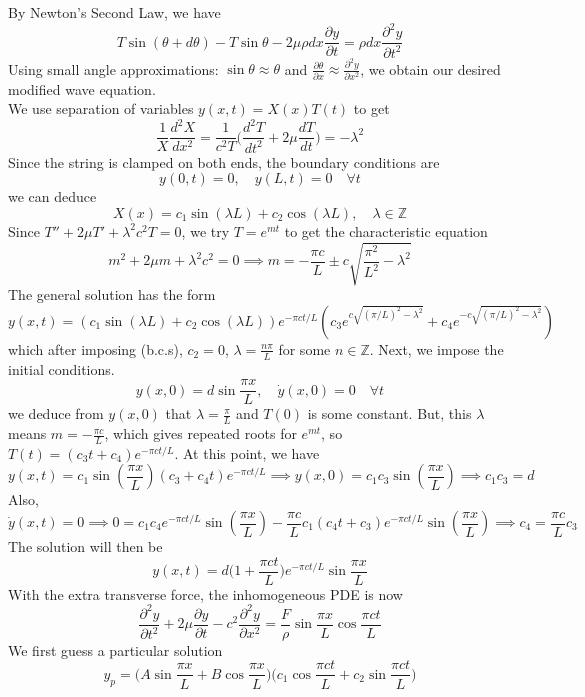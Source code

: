 \documentclass[a4paper]{article}
\begin{document}
\begin{ans}
By Newton's Second Law, we have
$$T\sin(\theta+d\theta)-T\sin\theta-2\mu\rho dx\frac{\partial y}{\partial t}=\rho dx\frac{\partial^2y}{\partial t^2}$$
Using small angle approximations: $\sin\theta\approx\theta$ and $\frac{\partial\theta}{\partial x}\approx\frac{\partial^2y}{\partial x^2}$, we obtain our desired modified wave equation.\\[5pt]
We use separation of variables $y(x,t)=X(x)T(t)$ to get $$\frac{1}{X}\frac{d^2X}{dx^2}=\frac{1}{c^2T}\bigg(\frac{d^2T}{dt^2}+2\mu\frac{dT}{dt}\bigg)=-\lambda^2$$
Since the string is clamped on both ends, the boundary conditions are 
\begin{equation}
    y(0,t)=0,\quad y(L,t)=0\quad \forall t\tag{b.c.s}
\end{equation}
we can deduce 
$$X(x)=c_1\sin(\lambda L)+c_2\cos(\lambda L),\quad\lambda\in\mathbb{Z}$$
Since $T''+2\mu T'+\lambda^2c^2T=0$, we try $T=e^{mt}$ to get the characteristic equation
$$m^2+2\mu m+\lambda^2c^2=0\implies m=-\frac{\pi c}{L}\pm c\sqrt{\frac{\pi^2}{L^2}-\lambda^2}$$
The general solution has the form
$$y(x,t)=(c_1\sin(\lambda L)+c_2\cos(\lambda L))e^{-\pi ct/L}(c_3e^{c\sqrt{(\pi/L)^2-\lambda^2}}+c_4e^{-c\sqrt{(\pi/L)^2-\lambda^2}})$$
which after imposing (b.c.s), $c_2=0$, $\lambda=\frac{n\pi}{L}$ for some $n\in\mathbb{Z}$. Next, we impose the initial conditions. 
\begin{equation}
    y(x,0)=d\sin\frac{\pi x}{L},\quad\dot{y}(x,0)=0\quad \forall t \tag{i.c.s}
\end{equation}
we deduce from $y(x,0)$ that $\lambda=\frac{\pi}{L}$ and $T(0)$ is some constant. But, this $\lambda$ means $m=-\frac{\pi c}{L}$, which gives repeated roots for $e^{mt}$, so $T(t)=(c_3t+c_4)e^{-\pi ct/L}$. At this point, we have 
$$y(x,t)=c_1\sin(\frac{\pi x}{L})(c_3+c_4t)e^{-\pi ct/L}\implies y(x,0)=c_1c_3\sin(\frac{\pi x}{L})\implies  c_1c_3=d$$
Also, 
$$\dot{y}(x,t)=0\implies 0=c_1c_4e^{-\pi ct/L}\sin(\frac{\pi x}{L})-\frac{\pi c}{L}c_1(c_4t+c_3)e^{-\pi ct/L}\sin(\frac{\pi x}{L})\implies c_4=\frac{\pi c}{L}c_3$$
The solution will then be
$$y(x,t)=d\bigg(1+\frac{\pi ct}{L}\bigg)e^{-\pi ct/L}\sin\frac{\pi x}{L}$$
With the extra transverse force, the inhomogeneous PDE is now
$$\frac{\partial^2y}{\partial t^2}+2\mu\frac{\partial y}{\partial t}-c^2\frac{\partial^2y}{\partial x^2}=\frac{F}{\rho}\sin\frac{\pi x}{L}\cos\frac{\pi ct}{L}$$
We first guess a particular solution 
$$y_p=\bigg(A\sin\frac{\pi x}{L}+B\cos\frac{\pi x}{L}\bigg)\bigg(c_1\cos\frac{\pi ct}{L}+c_2\sin\frac{\pi ct}{L}\bigg)$$

\end{ans}
\end{document}
